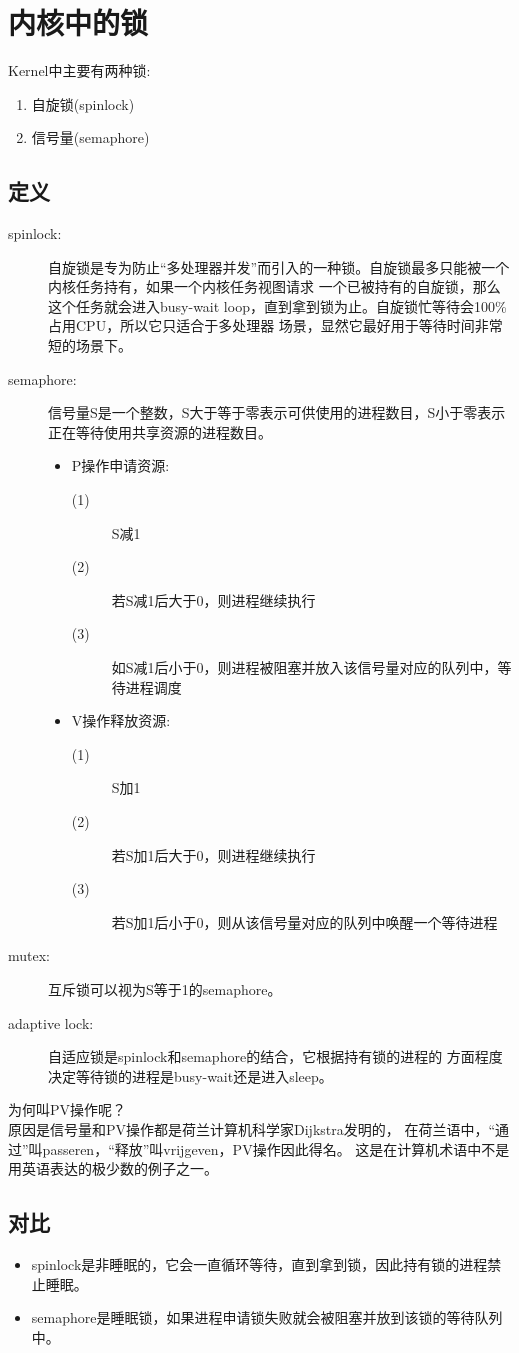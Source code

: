 \section[locks in kernel]{内核中的锁}
Kernel中主要有两种锁:
\begin{enumerate}
  \item 自旋锁(spinlock)
  \item 信号量(semaphore)
\end{enumerate}

\subsection[定义]{定义}
\begin{description}
  \item[spinlock: ] 自旋锁是专为防止“多处理器并发”而引入的一种锁。自旋锁最多只能被一个内核任务持有，如果一个内核任务视图请求
  一个已被持有的自旋锁，那么这个任务就会进入busy-wait loop，直到拿到锁为止。自旋锁忙等待会100\%占用CPU，所以它只适合于多处理器
  场景，显然它最好用于等待时间非常短的场景下。
  \item[semaphore: ] 信号量S是一个整数，S大于等于零表示可供使用的进程数目，S小于零表示正在等待使用共享资源的进程数目。
  \begin{itemize}
    \item P操作申请资源:
    \begin{description}
      \item[(1)] S减1
      \item[(2)] 若S减1后大于0，则进程继续执行
      \item[(3)] 如S减1后小于0，则进程被阻塞并放入该信号量对应的队列中，等待进程调度
    \end{description}
    \item V操作释放资源:
    \begin{description}
      \item[(1)] S加1
      \item[(2)] 若S加1后大于0，则进程继续执行
      \item[(3)] 若S加1后小于0，则从该信号量对应的队列中唤醒一个等待进程
    \end{description}
  \end{itemize}
  \item[mutex: ] 互斥锁可以视为S等于1的semaphore。
  \item[adaptive lock: ] 自适应锁是spinlock和semaphore的结合，它根据持有锁的进程的
  方面程度决定等待锁的进程是busy-wait还是进入sleep。
\end{description}
为何叫PV操作呢？\\
原因是信号量和PV操作都是荷兰计算机科学家Dijkstra发明的，
在荷兰语中，“通过”叫passeren，“释放”叫vrijgeven，PV操作因此得名。
这是在计算机术语中不是用英语表达的极少数的例子之一。

\subsection[对比]{对比}
\begin{itemize}
  \item spinlock是非睡眠的，它会一直循环等待，直到拿到锁，因此持有锁的进程禁止睡眠。
  \item semaphore是睡眠锁，如果进程申请锁失败就会被阻塞并放到该锁的等待队列中。
\end{itemize}
